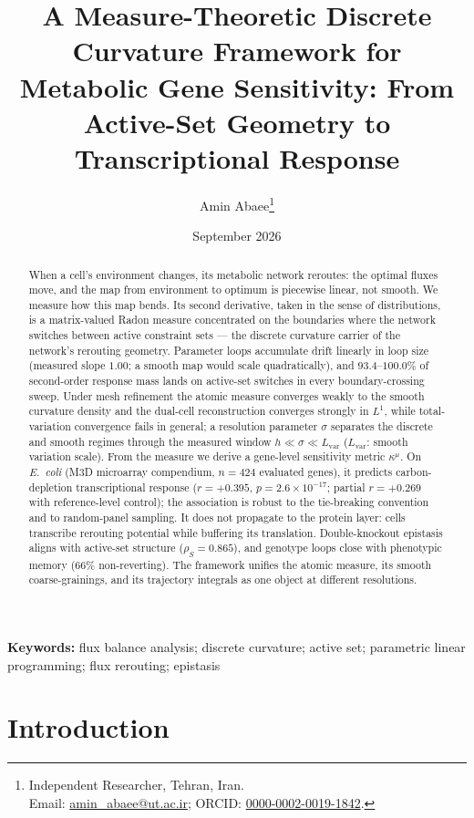 \documentclass[11pt,a4paper]{article}
\title{A Measure-Theoretic Discrete Curvature Framework for Metabolic
       Gene Sensitivity: From Active-Set Geometry to Transcriptional
       Response}
\author{Amin Abaee\thanks{Independent Researcher, Tehran, Iran.\\
  Email: \href{mailto:amin_abaee@ut.ac.ir}{amin\_abaee@ut.ac.ir}; ORCID:
  \href{https://orcid.org/0000-0002-0019-1842}{0000-0002-0019-1842}.}}
\date{September 2026}
\theoremstyle{plain}
\theoremstyle{definition}
\theoremstyle{remark}
\newcommand{\kmu}{\kappa^{\mu}}
\begin{document}
\linenumbers
\maketitle

\begin{abstract}
\noindent
When a cell's environment changes, its metabolic network reroutes: the
optimal fluxes move, and the map from environment to optimum is
piecewise linear, not smooth. We measure how this
map bends. Its second derivative, taken in the sense of distributions,
is a matrix-valued Radon measure concentrated on the boundaries
where the network switches between active constraint sets --- the
discrete curvature carrier of the network's
rerouting geometry. Parameter loops accumulate drift linearly in loop
size (measured slope $1.00$; a smooth map would scale
quadratically), and $93.4$--$100.0\%$ of second-order response mass
lands on active-set switches in every boundary-crossing sweep. Under
mesh refinement the atomic measure converges weakly to the smooth
curvature density and the dual-cell reconstruction converges strongly
in $L^1$, while total-variation convergence fails in general; a
resolution parameter $\sigma$ separates the discrete and smooth regimes
through the measured window $h \ll \sigma \ll L_{\mathrm{var}}$
($L_{\mathrm{var}}$: smooth variation scale). From the measure we derive a
gene-level sensitivity metric $\kmu$. On \emph{E.~coli} (M3D
microarray compendium, $n=424$ evaluated genes), it predicts
carbon-depletion transcriptional
response ($r = +0.395$, $p = 2.6 \times 10^{-17}$; partial $r = +0.269$
with reference-level control); the association is robust to the
tie-breaking convention and to random-panel sampling. It does not
propagate to the protein layer: cells transcribe rerouting potential
while buffering its translation. Double-knockout epistasis aligns with active-set
structure ($\rho_S = 0.865$), and genotype loops close with
phenotypic memory ($66\%$ non-reverting). The framework unifies the
atomic measure, its smooth coarse-grainings, and its trajectory
integrals as one object at different
resolutions.
\end{abstract}

\medskip
\noindent\textbf{Keywords:} flux balance analysis; discrete curvature;
active set; parametric linear programming; flux rerouting; epistasis

\bigskip

\section{Introduction}\label{sec:intro}
\end{document}
